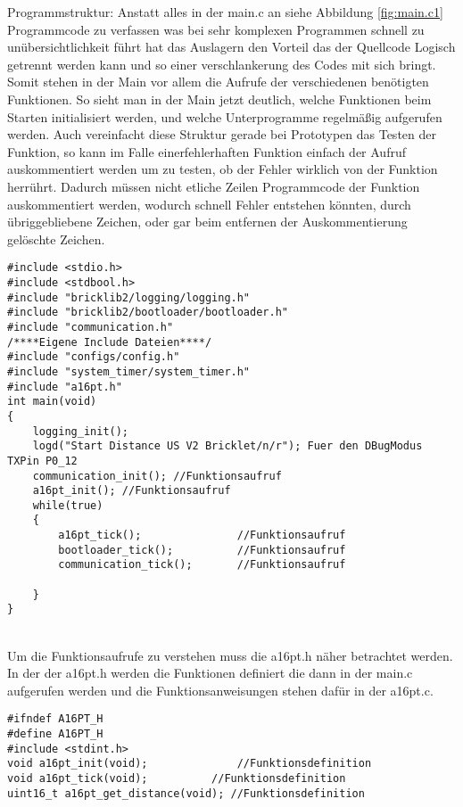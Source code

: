 Programmstruktur:
Anstatt alles in der main.c an siehe Abbildung \ref{fig:main.c1} Programmcode zu verfassen was bei sehr komplexen Programmen schnell zu unübersichtlichkeit führt hat das Auslagern den Vorteil das der Quellcode Logisch getrennt werden kann und so einer verschlankerung des Codes mit sich bringt. 
Somit stehen in der Main  vor allem die Aufrufe der verschiedenen benötigten Funktionen. So sieht man in der Main jetzt deutlich, welche Funktionen beim Starten initialisiert werden, und welche Unterprogramme regelmäßig aufgerufen werden. Auch vereinfacht diese Struktur gerade bei Prototypen das Testen der Funktion, so kann im Falle einerfehlerhaften Funktion einfach der Aufruf auskommentiert werden um zu testen, ob der Fehler wirklich von der Funktion herrührt. Dadurch müssen nicht etliche Zeilen Programmcode der Funktion auskommentiert werden, wodurch schnell Fehler entstehen könnten, durch übriggebliebene Zeichen, oder gar beim entfernen der Auskommentierung gelöschte Zeichen.\\
\begin{minipage}{0.75\textwidth}
\begin{lstlisting}
#include <stdio.h>
#include <stdbool.h>
#include "bricklib2/logging/logging.h"
#include "bricklib2/bootloader/bootloader.h"
#include "communication.h"
/****Eigene Include Dateien****/
#include "configs/config.h"
#include "system_timer/system_timer.h"
#include "a16pt.h"
int main(void)
{ 
	logging_init(); 
	logd("Start Distance US V2 Bricklet/n/r"); Fuer den DBugModus TXPin P0_12 
	communication_init(); //Funktionsaufruf
	a16pt_init(); //Funktionsaufruf	
	while(true)
	{
		a16pt_tick(); 				//Funktionsaufruf
		bootloader_tick(); 			//Funktionsaufruf
		communication_tick(); 		//Funktionsaufruf
		
	}
}
\end{lstlisting}
\label{fig:main.c1}
\end{minipage}\\
Um die Funktionsaufrufe zu verstehen muss die a16pt.h näher betrachtet werden.
In der der a16pt.h werden die Funktionen definiert die dann in der main.c aufgerufen werden und die Funktionsanweisungen stehen dafür in der a16pt.c.\\
\begin{lstlisting}
#ifndef A16PT_H
#define A16PT_H
#include <stdint.h>
void a16pt_init(void);				//Funktionsdefinition
void a16pt_tick(void); 			//Funktionsdefinition
uint16_t a16pt_get_distance(void); //Funktionsdefinition
\end{lstlisting}

